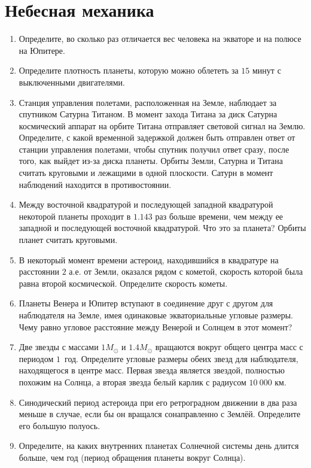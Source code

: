 \documentclass[12pt]{article}
\begin{document}
\section*{Небесная механика}
\begin{enumerate}[resume]
	\item Определите, во сколько раз отличается вес человека на экваторе и на полюсе на Юпитере.
    \item Определите плотность планеты, которую можно облететь за $15$ минут с выключенными двигателями.
    \item Станция управления полетами, расположенная на Земле, наблюдает за спутником Сатурна Титаном. В момент захода Титана за диск Сатурна космический аппарат на орбите Титана отправляет световой сигнал на Землю. Определите, с какой временной задержкой должен быть отправлен ответ от станции управления полетами, чтобы спутник получил ответ сразу, после того, как выйдет из-за диска планеты. Орбиты Земли, Сатурна и Титана считать круговыми и лежащими в одной плоскости. Сатурн в момент наблюдений находится в противостоянии.
    \item Между восточной квадратурой и последующей западной квадратурой некоторой планеты проходит в $1.143$ раз больше времени, чем между ее западной и последующей восточной квадратурой. Что это за планета? Орбиты планет считать круговыми. 
    \item В некоторый момент времени астероид, находившийся в квадратуре на расстоянии $2$ а.е. от Земли, оказался рядом с кометой, скорость которой была равна второй космической. Определите скорость кометы. 
    \item Планеты Венера и Юпитер вступают в соединение друг с другом для наблюдателя на Земле, имея одинаковые экваториальные угловые размеры. Чему равно угловое расстояние между Венерой и Солнцем в этот момент?
    \item Две звезды с массами $1M_{\odot}$ и $1.4M_{\odot}$ вращаются вокруг общего центра масс с периодом $1$~год. Определите угловые размеры обеих звезд для наблюдателя, находящегося в центре масс.
    Первая звезда является звездой, полностью похожим на Солнца, а вторая звезда белый карлик с радиусом $10~000$ км.
    \item Синодический период астероида при его ретроградном движении в два
    раза меньше в случае, если бы он вращался сонаправленно с Землёй. Определите его большую полуось.
    \item Определите, на каких внутренних планетах Солнечной системы день длится больше, чем год (период обращения планеты вокруг Солнца).
\end{enumerate}
\end{document}
